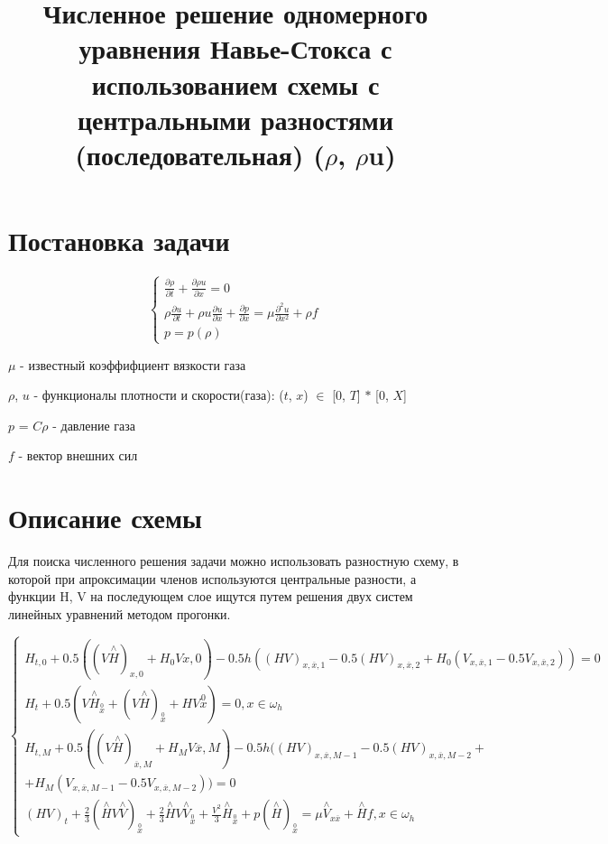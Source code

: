 \documentclass[a4paper, 12pt]{article}
\begin{document}
\title{Численное решение одномерного уравнения Навье-Стокса с использованием схемы с центральными разностями (последовательная) (\(\rho\), \(\rho\)u)}

\maketitle
\section{Постановка задачи}
\begin{equation*}
 \begin{cases}
\frac{\partial \rho}{\partial t}+  \frac{\partial \rho u}{\partial x}=0
\\
\rho \frac{\partial u}{\partial t}+\rho u \frac{\partial u}{\partial x}+ \frac{\partial p}{\partial x}=\mu \frac{\partial^{2}u}{\partial x^{2}} +\rho f
\\
p=p(\rho)
 \end{cases}
\end{equation*}

\(\mu\) - известный коэффифциент вязкости газа

\(\rho\), \(u\) - функционалы плотности и скорости(газа): (\(t\), \(x\)) \(\in\) [0, \(T\)] \(*\) [0, \(X\)]

\(p\) = \(C\)\(\rho\) - давление газа

\(f\) - вектор внешних сил

\bigskip
\section{Описание схемы}
Для поиска численного решения задачи можно использовать разностную схему, в которой при апроксимации членов используются центральные разности, а функции H, V на последующем слое ищутся путем
решения двух систем линейных уравнений методом прогонки.

\begin{equation*}
\begin{cases}
H_{t,0}+0.5((V\stackrel{\wedge}{H})_{x,0}+H_{0}V{x,0})-0.5h((HV)_{x,\overline{x},1}-0.5(HV)_{x,\overline{x},2}+H_{0}(V_{x, \overline{x},1}-0.5V_{x, \overline{x},2}))=0
\\
H_{t}+ 0.5(V \stackrel{\wedge}{H}_{\stackrel{0}{x}}+(V \stackrel{\wedge}{H})_{\stackrel{0}{x}}+HV{\stackrel{0}{x}})=0,x \in \omega_{h}
\\
H_{t,M}+0.5((V\stackrel{\wedge}{H})_{\overline x,M}+H_{M}V{\overline x,M})-0.5h((HV)_{x,\overline{x},M-1}-0.5(HV)_{x,\overline{x},M-2}+
\\
+H_{M}(V_{x, \overline{x},M-1}-0.5V_{x, \overline{x},M-2}))=0
\\
(HV)_{t}+\frac{2}{3}( \stackrel{\wedge}{H} V \stackrel{\wedge}{V})_{\stackrel{0}{x}} 
+ \frac{2}{3} \stackrel{\wedge}{H} V \stackrel{\wedge}{V}_{\stackrel{0}{x}}
+ \frac{{V}^{2}}{3}\stackrel{\wedge}{H}_{\stackrel{0}{x}}
+ p( \stackrel{\wedge}{H})_{\stackrel{0}{x}} = 
\mu \stackrel{\wedge}{V}_{x \overline x}
+\stackrel{\wedge}{H}f ,   x \in \omega_{h}
\end{cases}
\end{equation*}
\end{document}
